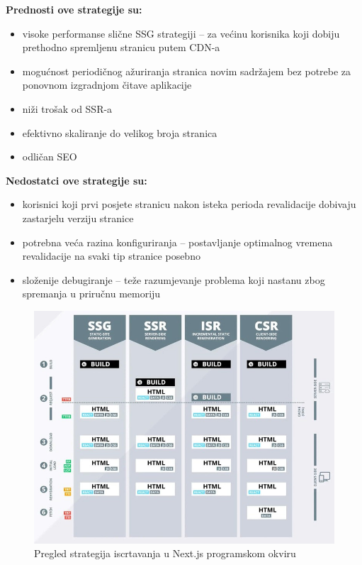 \bigskip

\textbf{Prednosti ove strategije su:}
\begin{itemize}
    \item visoke performanse slične SSG strategiji – za većinu korisnika koji dobiju prethodno spremljenu stranicu putem CDN-a
    \item mogućnost periodičnog ažuriranja stranica novim sadržajem bez potrebe za ponovnom izgradnjom čitave aplikacije
    \item niži trošak od SSR-a
    \item efektivno skaliranje do velikog broja stranica
    \item odličan SEO
\end{itemize}

\bigskip

\textbf{Nedostatci ove strategije su:}

\begin{itemize}
    \item korisnici koji prvi posjete stranicu nakon isteka perioda revalidacije dobivaju zastarjelu verziju stranice
    \item potrebna veća razina konfiguriranja – postavljanje optimalnog vremena revalidacije na svaki tip stranice posebno
    \item složenije debugiranje – teže razumjevanje problema koji nastanu zbog spremanja u priručnu memoriju \cite{flaws2021isr}
\end{itemize}


\begin{figure}[H]
    \centering
    \includegraphics[width=\textwidth]{slike/pregled-strategija-iscrtavanja.jpg}
    \caption{Pregled strategija iscrtavanja u Next.js programskom okviru\cite{dumais2021nextjs}}
    \label{fig:pregled-strategija-iscrtavanja}
\end{figure}

